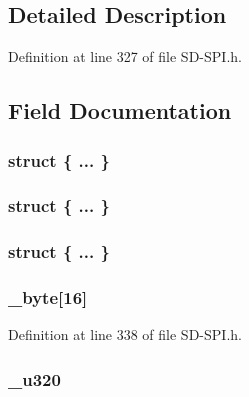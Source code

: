 \subsection{Detailed Description}


Definition at line 327 of file S\+D-\/\+S\+P\+I.\+h.



\subsection{Field Documentation}
\hypertarget{union_c_s_d_a9a4b1e22a90aded838eaadcc9592c189}{}\subsubsection[{"@31}]{\setlength{\rightskip}{0pt plus 5cm}struct \{ ... \} }\label{union_c_s_d_a9a4b1e22a90aded838eaadcc9592c189}
\hypertarget{union_c_s_d_ad6abaa72c83f0422fbc00b9baab3c4f7}{}\subsubsection[{"@33}]{\setlength{\rightskip}{0pt plus 5cm}struct \{ ... \} }\label{union_c_s_d_ad6abaa72c83f0422fbc00b9baab3c4f7}
\hypertarget{union_c_s_d_a3724f38901097402a7bb94104701f035}{}\subsubsection[{"@35}]{\setlength{\rightskip}{0pt plus 5cm}struct \{ ... \} }\label{union_c_s_d_a3724f38901097402a7bb94104701f035}
\hypertarget{union_c_s_d_a89bb97022529d46ff9cac7274a7b9faa}{}
\subsubsection[{\+\_\+byte}]{ \+\_\+byte\mbox{[}16\mbox{]}}\label{union_c_s_d_a89bb97022529d46ff9cac7274a7b9faa}


Definition at line 338 of file S\+D-\/\+S\+P\+I.\+h.

\hypertarget{union_c_s_d_a446384ca0781a9e9ed10e276b4a58701}{}
\subsubsection[{\+\_\+u320}]{ \+\_\+u320}\label{union_c_s_d_a446384ca0781a9e9ed10e276b4a58701}


